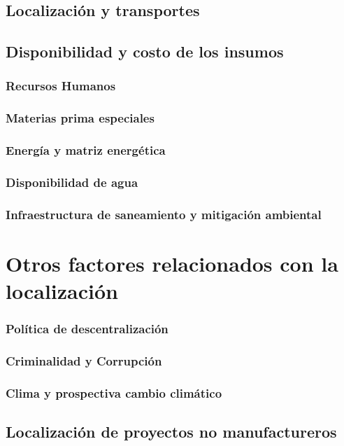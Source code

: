 \documentclass[crop=false]{standalone}
\begin{document}
\subsection{Localización y transportes}
\subsection{Disponibilidad y costo de los insumos}
\subsubsection{Recursos Humanos}
\subsubsection{Materias prima especiales}
\subsubsection{Energía y matriz energética}
\subsubsection{Disponibilidad de agua}
\subsubsection{Infraestructura de saneamiento y mitigación ambiental}

\section{Otros factores relacionados con la localización}

\subsubsection{Política de descentralización}
\subsubsection{Criminalidad y Corrupción}
\subsubsection{Clima y prospectiva cambio climático}

\subsection{Localización de proyectos no manufactureros}
\end{document}
